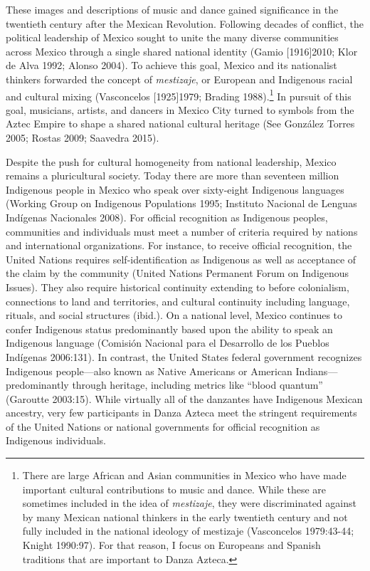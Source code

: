 \documentclass[twoside]{article}
\begin{document}
These images and descriptions of music and dance gained significance in
the twentieth century after the Mexican Revolution. Following decades of
conflict, the political leadership of Mexico sought to unite the many
diverse communities across Mexico through a single shared national
identity (Gamio {[}1916{]}2010; Klor de Alva 1992; Alonso 2004). To
achieve this goal, Mexico and its nationalist thinkers forwarded the
concept of \emph{mestizaje}, or European and Indigenous racial and
cultural mixing (Vasconcelos {[}1925{]}1979; Brading 1988).\footnote{There
  are large African and Asian communities in Mexico who have made
  important cultural contributions to music and dance. While these are
  sometimes included in the idea of \emph{mestizaje}, they were
  discriminated against by many Mexican national thinkers in the early
  twentieth century and not fully included in the national ideology of
  mestizaje (Vasconcelos 1979:43-44; Knight 1990:97). For that reason, I
  focus on Europeans and Spanish traditions that are important to Danza
  Azteca.} In pursuit of this goal, musicians, artists, and dancers in
Mexico City turned to symbols from the Aztec Empire to shape a shared
national cultural heritage (See González Torres 2005; Rostas 2009;
Saavedra 2015).

Despite the push for cultural homogeneity from national leadership,
Mexico remains a pluricultural society. Today there are more than
seventeen million Indigenous people in Mexico who speak over sixty-eight
Indigenous languages (Working Group on Indigenous Populations 1995;
Instituto Nacional de Lenguas Indígenas Nacionales 2008). For official
recognition as Indigenous peoples, communities and individuals must meet
a number of criteria required by nations and international
organizations. For instance, to receive official recognition, the United
Nations requires self-identification as Indigenous as well as acceptance
of the claim by the community (United Nations Permanent Forum on
Indigenous Issues). They also require historical continuity extending to
before colonialism, connections to land and territories, and cultural
continuity including language, rituals, and social structures (ibid.).
On a national level, Mexico continues to confer Indigenous status
predominantly based upon the ability to speak an Indigenous language
(Comisión Nacional para el Desarrollo de los Pueblos Indígenas
2006:131). In contrast, the United States federal government recognizes
Indigenous people---also known as Native Americans or American
Indians---predominantly through heritage, including metrics like ``blood
quantum'' (Garoutte 2003:15). While virtually all of the danzantes have
Indigenous Mexican ancestry, very few participants in Danza Azteca meet
the stringent requirements of the United Nations or national governments
for official recognition as Indigenous individuals.
\end{document}
